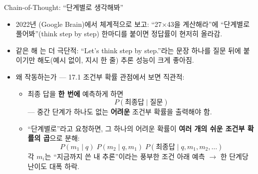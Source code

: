 \begin{frame}{Chain-of-Thought: ``단계별로 생각해봐''}
  \begin{itemize}
    \item 2022년 (Google Brain)에서 체계적으로
      보고: ``27$\times$43을 계산해라''에 ``단계별로
      풀어봐''(think step by step) 한마디를 붙이면 정답률이
      현저히 올라감.
    \item 같은 해 는 더 극단적: ``Let's
      think step by step.''라는 문장 하나를 질문 뒤에
      붙이기만 해도(예시 없이, 지시 한 줄) 추론 성능이
      크게 좋아짐.
    \item 왜 작동하는가 — 17.1 조건부 확률 관점에서 보면
      직관적:
      \begin{itemize}
        \item 최종 답을 \textbf{한 번에} 예측하게 하면
          \[P(\text{최종답} \mid \text{질문})\]
          --- 중간 단계가 하나도 없는 \textbf{어려운}
          조건부 확률을 출력해야 함.
        \item ``단계별로''라고 요청하면, 그 하나의 어려운
          확률이 \textbf{여러 개의 쉬운 조건부 확률의
          곱}으로 분해:
          \[P(m_1 \mid q) \; P(m_2 \mid q, m_1) \;
          P(\text{최종답} \mid q, m_1, m_2, \ldots)\]
          각 $m_i$는 ``지금까지 쓴 내 추론''이라는 풍부한
          조건 아래 예측 $\to$ 한 단계당 난이도 대폭 하락.
      \end{itemize}
  \end{itemize}
\end{frame}
